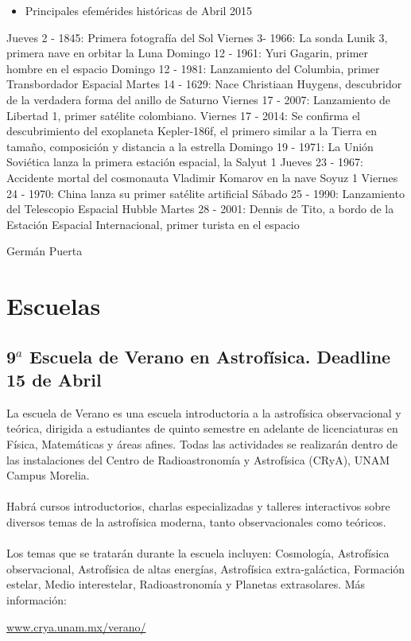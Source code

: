 \documentclass{book}
\begin{document}
\begin{itemize}
\item Principales efemérides históricas de Abril 2015
\end{itemize} 
    Jueves 2 - 1845: Primera fotografía del Sol
    Viernes 3- 1966: La sonda Lunik 3, primera nave en orbitar la Luna
    Domingo 12 - 1961: Yuri Gagarin, primer hombre en el espacio
    Domingo 12 - 1981: Lanzamiento del Columbia, primer Transbordador Espacial
    Martes 14 - 1629: Nace Christiaan Huygens, descubridor de la verdadera forma del anillo de Saturno
    Viernes 17 - 2007: Lanzamiento de Libertad 1, primer satélite colombiano.
    Viernes 17 - 2014: Se confirma el descubrimiento del exoplaneta Kepler-186f, el primero similar a la Tierra en tamaño, composición y distancia a la estrella
    Domingo 19 - 1971: La Unión Soviética lanza la primera estación espacial, la Salyut 1
    Jueves 23 - 1967: Accidente mortal del cosmonauta Vladimir Komarov en la nave Soyuz 1         
    Viernes 24 - 1970: China lanza su primer satélite artificial
    Sábado 25 - 1990: Lanzamiento del Telescopio Espacial Hubble
    Martes 28 - 2001: Dennis de Tito, a bordo de la Estación Espacial Internacional, primer turista en el espacio         
    \begin{flushright}
    Germán Puerta
    \end{flushright}
 \newpage
       \section*{Escuelas}

\subsection{9$^{a}$ Escuela de Verano en Astrofísica.  Deadline 15 de Abril }

La escuela de Verano es una escuela introductoria a la astrofísica observacional y teórica, dirigida a estudiantes de quinto semestre en adelante de licenciaturas en Física, Matemáticas y áreas afines. Todas las actividades se realizarán dentro de las instalaciones del Centro de Radioastronomía y Astrofísica (CRyA), UNAM Campus Morelia.\\
\\
Habrá cursos introductorios, charlas especializadas y talleres interactivos sobre diversos temas de la astrofísica moderna, tanto observacionales como teóricos.\\
\\
Los temas que se tratarán durante la escuela incluyen: Cosmología, Astrofísica observacional, Astrofísica de altas energías, Astrofísica extra-galáctica, Formación estelar, Medio interestelar, Radioastronomía y Planetas extrasolares. Más información:
\begin{center}
\url{www.crya.unam.mx/verano/}
\end{center}
\end{document}

